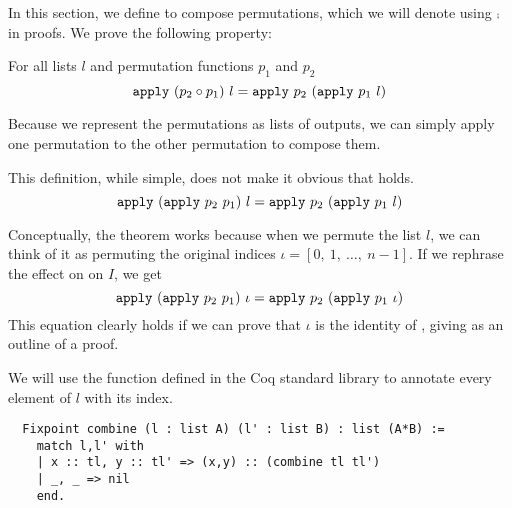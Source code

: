 \documentclass[sigplan,10pt,anonymous,review]{thesis}
\begin{document}
In this section, we define  to compose permutations,
which we will denote using $\comp$ in proofs. We prove the following
property:

\begin{theorem}
  For all lists $l$ and permutation functions $p_1$ and $p_2$
  \begin{equation*}
      \texttt{apply}~(p_2 \circ p_1)~l = \texttt{apply}~p_2~(\texttt{apply}~p_1~l)
  \end{equation*}
\end{theorem}

Because we represent the permutations as lists of outputs, we can
simply apply one permutation to the other permutation to compose them.

This definition, while simple, does not make it obvious that
 holds.
\begin{equation}
  \label{eq:compose_apply}
  \texttt{apply}~(\texttt{apply}~p_2~p_1)~l = \texttt{apply}~p_2~(\texttt{apply}~p_1~l)
\end{equation}

Conceptually, the theorem works because when we permute the list $l$,
we can think of it as permuting the original indices $\iota =
[0,~1,~\ldots,~n-1]$. If we rephrase  the effect on
on $I$, we get
\begin{equation*}
  \texttt{apply}~(\texttt{apply}~p_2~p_1)~\iota = \texttt{apply}~p_2~(\texttt{apply}~p_1~\iota)
\end{equation*}
This equation clearly holds if we can prove that $\iota$ is the identity
of , giving as an outline of a proof.

We will use the function  defined in the Coq standard
library to annotate every element of $l$ with its index.
\begin{lstlisting}
  Fixpoint combine (l : list A) (l' : list B) : list (A*B) :=
    match l,l' with
    | x :: tl, y :: tl' => (x,y) :: (combine tl tl')
    | _, _ => nil
    end.
\end{lstlisting}
\end{document}
